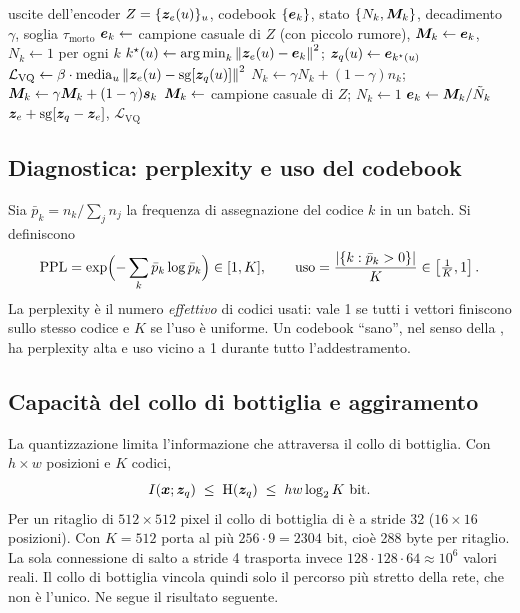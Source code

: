 \begin{algorithm}[t]
  \caption{Passo di addestramento del quantizzatore con EMA e riavvio dei codici morti}
  \label{alg:vq-ema}
  \begin{algorithmic}[1]
    \Require uscite dell'encoder $Z=\{\bm{z}_e(u)\}_{u}$, codebook $\{\bm{e}_k\}$, stato $\{N_k,\bm{M}_k\}$, decadimento $\gamma$, soglia $\tau_{\mathrm{morto}}$
      \State $\bm{e}_k\gets$ campione casuale di $Z$ (con piccolo rumore), $\bm{M}_k\gets\bm{e}_k$, $N_k\gets1$ per ogni $k$
    \EndIf
    \State $k^\star(u)\gets\operatorname*{arg\,min}_k\left\lVert \bm{z}_e(u)-\bm{e}_k \right\rVert^2$; \quad $\bm{z}_q(u)\gets\bm{e}_{k^\star(u)}$
    \State $\mathcal{L}_{\mathrm{VQ}}\gets\beta\cdot\mathrm{media}_u\left\lVert \bm{z}_e(u)-\operatorname{sg}[\bm{z}_q(u)] \right\rVert^2$
    \State $N_k\gets\gamma N_k+(1-\gamma)n_k$; \quad $\bm{M}_k\gets\gamma\bm{M}_k+(1-\gamma)\bm{s}_k$
      \State $\bm{M}_k\gets$ campione casuale di $Z$; \quad $N_k\gets1$ 
    \EndFor
    \State $\bm{e}_k\gets\bm{M}_k/\tilde N_k$
    \State \Return $\bm{z}_e+\operatorname{sg}[\bm{z}_q-\bm{z}_e]$, $\mathcal{L}_{\mathrm{VQ}}$
  \end{algorithmic}
\end{algorithm}

\subsection{Diagnostica: perplexity e uso del codebook}

Sia $\bar p_k=n_k/\sum_jn_j$ la frequenza di assegnazione del codice $k$ in un batch. Si
definiscono
\begin{equation}
  \operatorname{PPL}=\exp\Bigl(-\sum_{k}\bar p_k\log\bar p_k\Bigr)\in[1,K],
  \qquad
  \mathrm{uso}=\frac{\left\lvert \{k:\bar p_k>0\} \right\rvert}{K}\in\left[\tfrac1K,1\right].
  \label{eq:perplexity}
\end{equation}
La perplexity è il numero \emph{effettivo} di codici usati: vale 1 se tutti i vettori finiscono
sullo stesso codice e $K$ se l'uso è uniforme. Un codebook \enquote{sano}, nel senso della
, ha perplexity alta e uso vicino a 1 durante tutto l'addestramento.

\subsection{Capacità del collo di bottiglia e aggiramento}
\label{sec:vq-aggiramento}

La quantizzazione limita l'informazione che attraversa il collo di bottiglia. Con $h\times w$
posizioni e $K$ codici,
\begin{equation}
  I(\vect{x};\vect{z}_q)\;\le\;\Hent(\vect{z}_q)\;\le\;hw\log_2K\ \text{bit}.
  \label{eq:capacita}
\end{equation}
Per un ritaglio di $512\times512$ pixel il collo di bottiglia di \maresunet{} è a stride 32
($16\times16$ posizioni). Con $K=512$ porta al più $256\cdot9=\num{2304}$ bit, cioè 288 byte per
ritaglio. La sola connessione di salto a stride 4 trasporta invece
$128\cdot128\cdot64\approx10^6$ valori reali. Il collo di bottiglia vincola quindi solo il
percorso più stretto della rete, che non è l'unico. Ne segue il risultato seguente.

